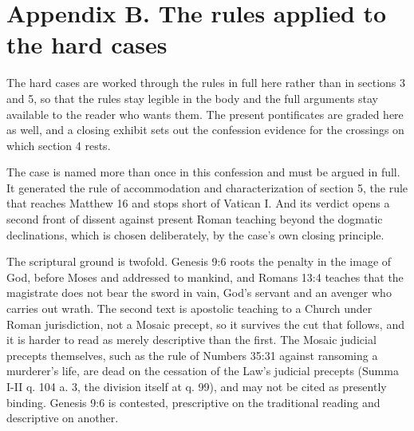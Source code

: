 \documentclass[11pt,twoside]{article}
\newcommand{\unit}[1]{\needspace{3\baselineskip}\par\medskip{\normalfont\bfseries\color{subhead}#1}\par\nobreak\smallskip}
\begin{document}
\clearpage
{}
\section*{\color{heading}Appendix B. The rules applied to the hard cases}
\noindent The hard cases are worked through the rules in full here rather than in sections 3 and 5, so that the rules stay legible in the body and the full arguments stay available to the reader who wants them. The present pontificates are graded here as well, and a closing exhibit sets out the confession evidence for the crossings on which section 4 rests.

\medskip
\unit{The death penalty.}
The case is named more than once in this confession and must be argued in full. It generated the rule of accommodation and characterization of section 5, the rule that reaches Matthew 16 and stops short of Vatican I. And its verdict opens a second front of dissent against present Roman teaching beyond the dogmatic declinations, which is chosen deliberately, by the case's own closing principle.

The scriptural ground is twofold. Genesis 9:6 roots the penalty in the image of God, before Moses and addressed to mankind, and Romans 13:4 teaches that the magistrate does not bear the sword in vain, God's servant and an avenger who carries out wrath. The second text is apostolic teaching to a Church under Roman jurisdiction, not a Mosaic precept, so it survives the cut that follows, and it is harder to read as merely descriptive than the first. The Mosaic judicial precepts themselves, such as the rule of Numbers 35:31 against ransoming a murderer's life, are dead on the cessation of the Law's judicial precepts (Summa I-II q. 104 a. 3, the division itself at q. 99), and may not be cited as presently binding. Genesis 9:6 is contested, prescriptive on the traditional reading and descriptive on another.
\end{document}
